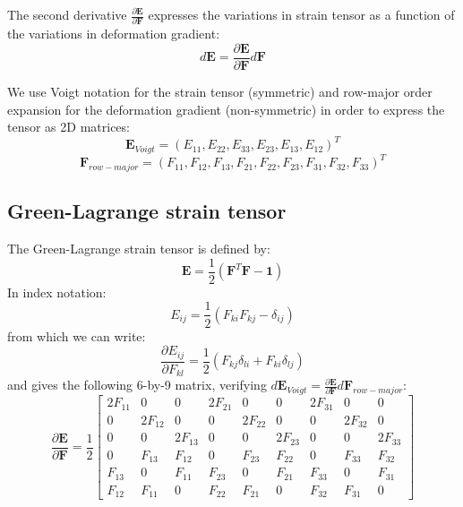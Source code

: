 \documentclass[letterpaper,12pt,oneside]{report}
\begin{document}
The second derivative $\frac{\partial \mathbf{E}}{\partial \mathbf{F}}$ expresses the variations in strain tensor as a function of the variations in deformation gradient:
\begin{equation}
d\mathbf{E} = \frac{\partial \mathbf{E}}{\partial \mathbf{F}} d\mathbf{F}
\end{equation}

We use Voigt notation for the strain tensor (symmetric) and row-major order expansion for the deformation gradient (non-symmetric) in order to express the tensor as 2D matrices:
\begin{equation}
\mathbf{E}_{Voigt} = (E_{11},E_{22},E_{33},E_{23},E_{13},E_{12})^T
\end{equation}
\begin{equation}
\mathbf{F}_{row-major} = (F_{11},F_{12},F_{13},F_{21},F_{22},F_{23},F_{31},F_{32},F_{33})^T
\end{equation}

\subsection{Green-Lagrange strain tensor}
The Green-Lagrange strain tensor is defined by:
\begin{equation}
\mathbf{E} = \frac{1}{2}\left(\mathbf{F}^T \mathbf{F} - \mathbf{1}\right)
\end{equation}
In index notation:
\begin{equation}
E_{ij} = \frac{1}{2}\left(F_{ki} F_{kj} - \delta_{ij}\right)
\end{equation}
from which we can write:
\begin{equation}
\frac{\partial E_{ij}}{\partial F_{kl}} = \frac{1}{2}\left(F_{kj} \delta_{li} + F_{ki} \delta_{lj}\right)
\end{equation}
and gives the following 6-by-9 matrix, verifying $d\mathbf{E}_{Voigt} = \frac{\partial \mathbf{E}}{\partial \mathbf{F}} d\mathbf{F}_{row-major}$:
\begin{equation}
\frac{\partial \mathbf{E}}{\partial \mathbf{F}} = \frac{1}{2}
\left[\begin{array}{ccccccccc}
2F_{11} & 0 & 0 & 2F_{21} & 0 & 0 & 2F_{31} & 0 & 0 \\
0 & 2F_{12} & 0 & 0 & 2F_{22} & 0 & 0 & 2F_{32} & 0 \\
0 & 0 & 2F_{13} & 0 & 0 & 2F_{23} & 0 & 0 & 2F_{33} \\
0 & F_{13} & F_{12} & 0 & F_{23} & F_{22} & 0 & F_{33} & F_{32} \\
F_{13} & 0 & F_{11} & F_{23} & 0 & F_{21} & F_{33} & 0 & F_{31} \\
F_{12} & F_{11} & 0 & F_{22} & F_{21} & 0 & F_{32} & F_{31} & 0
\end{array}\right]
\end{equation}
\end{document}
